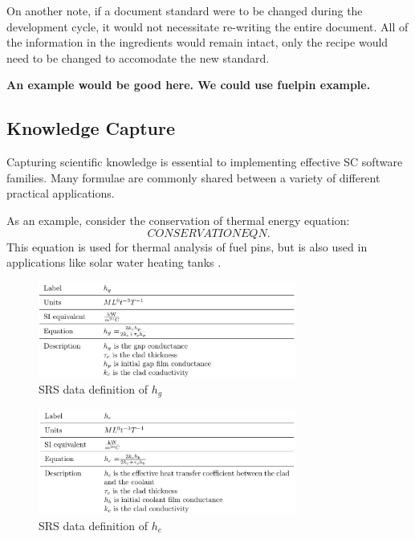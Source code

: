 \documentclass[10pt, preprint]{sigplanconf}
\begin{document}
On another note, if a document standard were to be changed during the 
development cycle, it would not necessitate re-writing the entire document. All
 of the information in the ingredients would remain intact, only the recipe 
 would need to be changed to accomodate the new standard.

\textbf{An example would be good here.  We could use fuelpin example.}

\subsection{Knowledge Capture} \label{subsec:knowledge}

Capturing scientific knowledge is essential to implementing effective SC
software families. Many formulae are commonly shared between a variety of 
different practical applications. %

As an example, consider the conservation of thermal energy equation:
\begin{equation}
CONSERVATION EQN.
\end{equation}
This equation is used for thermal analysis of fuel pins, %
but is also used in applications like solar water heating tanks \cite{}. 

\begin{figure}
	\includegraphics[width=8.5cm]{figures/h_g}
	\caption{SRS data definition of $h_g$}
\label{fig:h_g}
\end{figure}	

\begin{figure}
	\includegraphics[width=8.5cm]{figures/h_c}
	\caption{SRS data definition of $h_c$}
	\label{fig:h_c}
\end{figure}	
\end{document}
